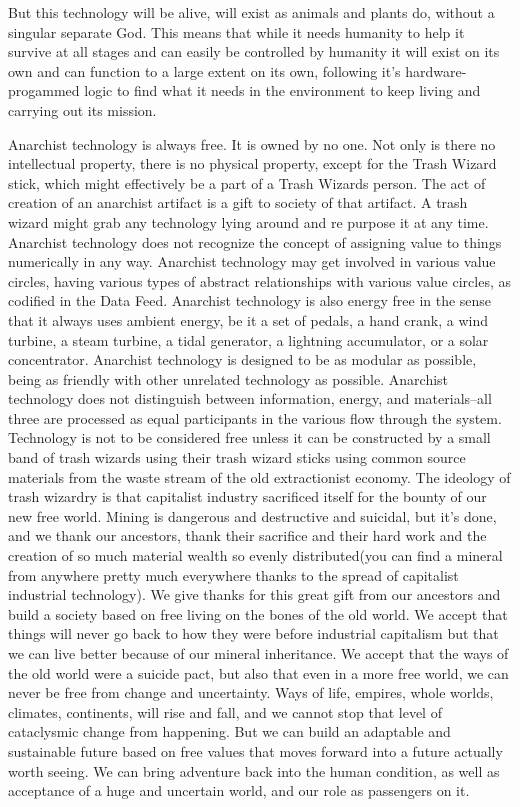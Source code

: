 But this technology will be alive, will exist as animals and plants do,
without a singular separate God. This means that while it needs humanity
to help it survive at all stages and can easily be controlled by
humanity it will exist on its own and can function to a large extent on
its own, following it's hardware-progammed logic to find what it needs
in the environment to keep living and carrying out its mission.

Anarchist technology is always free. It is owned by no one. Not only is
there no intellectual property, there is no physical property, except
for the Trash Wizard stick, which might effectively be a part of a Trash
Wizards person. The act of creation of an anarchist artifact is a gift
to society of that artifact. A trash wizard might grab any technology
lying around and re purpose it at any time. Anarchist technology does
not recognize the concept of assigning value to things numerically in
any way. Anarchist technology may get involved in various value circles,
having various types of abstract relationships with various value
circles, as codified in the Data Feed. Anarchist technology is also
energy free in the sense that it always uses ambient energy, be it a set
of pedals, a hand crank, a wind turbine, a steam turbine, a tidal
generator, a lightning accumulator, or a solar concentrator. Anarchist
technology is designed to be as modular as possible, being as friendly
with other unrelated technology as possible. Anarchist technology does
not distinguish between information, energy, and materials--all three
are processed as equal participants in the various flow through the
system. Technology is not to be considered free unless it can be
constructed by a small band of trash wizards using their trash wizard
sticks using common source materials from the waste stream of the old
extractionist economy. The ideology of trash wizardry is that capitalist
industry sacrificed itself for the bounty of our new free world. Mining
is dangerous and destructive and suicidal, but it's done, and we thank
our ancestors, thank their sacrifice and their hard work and the
creation of so much material wealth so evenly distributed(you can find a
mineral from anywhere pretty much everywhere thanks to the spread of
capitalist industrial technology). We give thanks for this great gift
from our ancestors and build a society based on free living on the bones
of the old world. We accept that things will never go back to how they
were before industrial capitalism but that we can live better because of
our mineral inheritance. We accept that the ways of the old world were a
suicide pact, but also that even in a more free world, we can never be
free from change and uncertainty. Ways of life, empires, whole worlds,
climates, continents, will rise and fall, and we cannot stop that level
of cataclysmic change from happening. But we can build an adaptable and
sustainable future based on free values that moves forward into a future
actually worth seeing. We can bring adventure back into the human
condition, as well as acceptance of a huge and uncertain world, and our
role as passengers on it.

